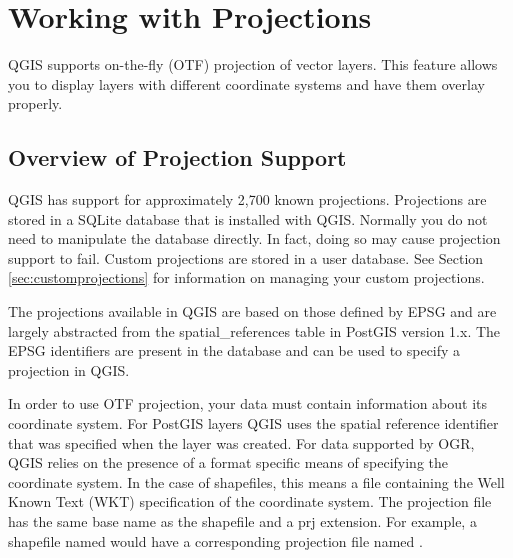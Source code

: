
\section{Working with Projections}\label{label_projections}


QGIS supports on-the-fly (OTF) projection of vector layers. This feature allows you
to display layers with different coordinate systems and have them overlay
properly.

\subsection{Overview of Projection Support}\label{label_projoverview}

QGIS has support for approximately 2,700 known projections. 
Projections are stored in a SQLite database that is installed with QGIS.
Normally you do not need to manipulate the database directly. In fact,
doing so may cause projection support to fail. Custom projections are
stored in a user database. See Section \ref{sec:customprojections} for
information on managing your custom projections.

The projections available in QGIS are based on those defined by
EPSG and are largely abstracted from the spatial\_references 
table in PostGIS version 1.x. The EPSG identifiers are
present in the database and can be used to specify a projection in QGIS.

In order to use OTF projection, your data must contain information about its
coordinate system. For PostGIS layers QGIS uses the spatial reference
identifier that was specified when the layer was created. For data supported
by OGR, QGIS relies on the presence of a format specific means of specifying
the coordinate system. In the case of shapefiles, this means a file containing
the Well Known Text (WKT) specification of the coordinate
system. The
projection file has the same base name as the shapefile and a prj extension.
For example, a shapefile named  would have a 
corresponding projection file named .


